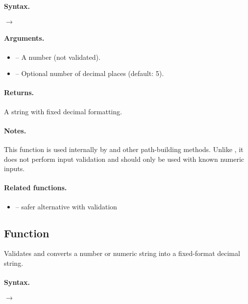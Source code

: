 \paragraph{Syntax.}
\begin{center}
 \hfill $\rightarrow$ 
\end{center}

\paragraph{Arguments.}
\begin{itemize}
\item {} – A number (not validated).
\item {} – Optional number of decimal places (default: 5).
\end{itemize}

\paragraph{Returns.}
A string with fixed decimal formatting.

\paragraph{Notes.}
This function is used internally by  and other path-building methods. Unlike , it does not perform input validation and should only be used with known numeric inputs.

\paragraph{Related functions.}
\begin{itemize}
\item {} – safer alternative with validation
\end{itemize}

\subsection{Function }
\label{sub:function_utils_checknumber}

Validates and converts a number or numeric string into a fixed-format decimal string.

\paragraph{Syntax.}
\begin{center}
 \hfill $\rightarrow$ 
\end{center}

